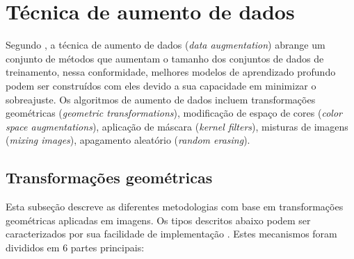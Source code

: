 \documentclass[
	12pt,				%
	oneside,			%
	a4paper,			%
	english,			%
	brazil				%
	]{abntex2ppgsi}
\begin{document}
\section{Técnica de aumento de dados}
Segundo , a técnica de aumento de dados (\textit{data augmentation}) abrange um conjunto de métodos que aumentam o tamanho dos conjuntos de dados de treinamento, nessa conformidade, melhores modelos de aprendizado profundo podem ser construídos com eles devido a sua capacidade em minimizar o sobreajuste. Os algoritmos de aumento de dados incluem transformações geométricas (\textit{geometric transformations}), modificação de espaço de cores (\textit{color space augmentations}), aplicação de máscara (\textit{kernel filters}), misturas de imagens (\textit{mixing images}), apagamento aleatório (\textit{random erasing}).

\subsection{Transformações geométricas}
Esta subseção descreve as diferentes metodologias com base em transformações geométricas aplicadas em imagens. Os tipos descritos abaixo podem ser caracterizados por sua facilidade de implementação \cite{shorten2019survey}. Estes mecanismos foram divididos em 6 partes principais:
\end{document}

